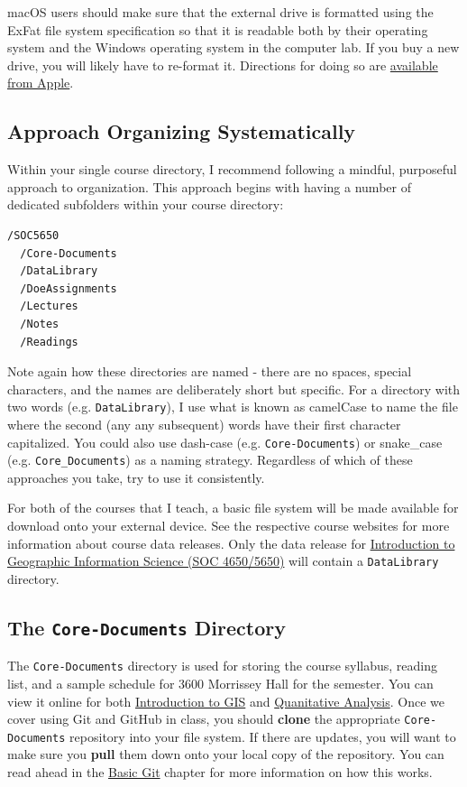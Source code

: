 \documentclass[]{book}
\theoremstyle{definition}
\theoremstyle{definition}
\theoremstyle{definition}
\theoremstyle{remark}
\begin{document}
macOS users should make sure that the external drive is formatted using
the ExFat file system specification so that it is readable both by their
operating system and the Windows operating system in the computer lab.
If you buy a new drive, you will likely have to re-format it. Directions
for doing so are
\href{https://support.apple.com/kb/PH22241?locale=en_US}{available from
Apple}.

\subsection{Approach Organizing
Systematically}\label{approach-organizing-systematically}

Within your single course directory, I recommend following a mindful,
purposeful approach to organization. This approach begins with having a
number of dedicated subfolders within your course directory:

\begin{verbatim}
/SOC5650
  /Core-Documents
  /DataLibrary
  /DoeAssignments
  /Lectures
  /Notes
  /Readings
\end{verbatim}

Note again how these directories are named - there are no spaces,
special characters, and the names are deliberately short but specific.
For a directory with two words (e.g. \texttt{DataLibrary}), I use what
is known as camelCase to name the file where the second (any any
subsequent) words have their first character capitalized. You could also
use dash-case (e.g. \texttt{Core-Documents}) or snake\_case (e.g.
\texttt{Core\_Documents}) as a naming strategy. Regardless of which of
these approaches you take, try to use it consistently.

For both of the courses that I teach, a basic file system will be made
available for download onto your external device. See the respective
course websites for more information about course data releases. Only
the data release for \href{https://slu-soc5650.github.io}{Introduction
to Geographic Information Science (SOC 4650/5650)} will contain a
\texttt{DataLibrary} directory.

\subsection{\texorpdfstring{The \texttt{Core-Documents}
Directory}{The Core-Documents Directory}}\label{the-core-documents-directory}

The \texttt{Core-Documents} directory is used for storing the course
syllabus, reading list, and a sample schedule for 3600 Morrissey Hall
for the semester. You can view it online for both
\href{https://github.com/slu-soc5050/Core-Documents}{Introduction to
GIS} and
\href{https://github.com/slu-soc5650/Core-Documents}{Quanitative
Analysis}. Once we cover using Git and GitHub in class, you should
\textbf{clone} the appropriate \texttt{Core-Documents} repository into
your file system. If there are updates, you will want to make sure you
\textbf{pull} them down onto your local copy of the repository. You can
read ahead in the \protect\hyperlink{basic-git}{Basic Git} chapter for
more information on how this works.
\end{document}
